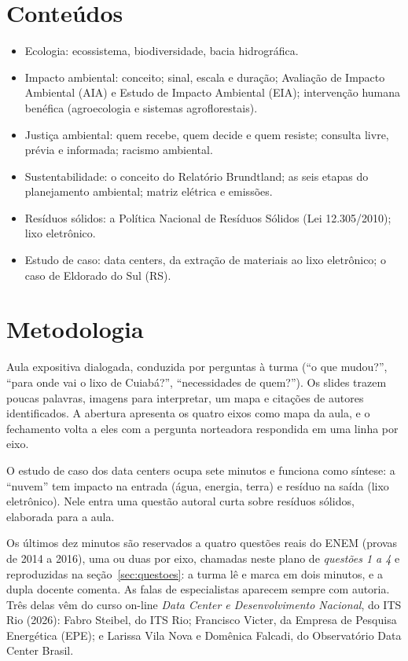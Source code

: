 \documentclass[11pt]{article}
\begin{document}
\section{Conteúdos}
\begin{itemize}
  \item Ecologia: ecossistema, biodiversidade, bacia hidrográfica.
  \item Impacto ambiental: conceito; sinal, escala e duração; Avaliação de Impacto Ambiental (AIA) e Estudo de
        Impacto Ambiental (EIA); intervenção humana benéfica (agroecologia e sistemas agroflorestais).
  \item Justiça ambiental: quem recebe, quem decide e quem resiste; consulta livre, prévia e informada; racismo ambiental.
  \item Sustentabilidade: o conceito do Relatório Brundtland; as seis etapas do planejamento ambiental;
        matriz elétrica e emissões.
  \item Resíduos sólidos: a Política Nacional de Resíduos Sólidos (Lei 12.305/2010); lixo eletrônico.
  \item Estudo de caso: data centers, da extração de materiais ao lixo eletrônico; o caso de Eldorado do Sul (RS).
\end{itemize}

\section{Metodologia}
Aula expositiva dialogada, conduzida por perguntas à turma (\enquote{o que mudou?}, \enquote{para onde vai o lixo
de Cuiabá?}, \enquote{necessidades de quem?}). Os slides trazem poucas palavras, imagens para interpretar, um mapa
e citações de autores identificados. A abertura apresenta os quatro eixos como mapa da aula, e o fechamento volta
a eles com a pergunta norteadora respondida em uma linha por eixo.

O estudo de caso dos data centers ocupa sete minutos e funciona como síntese: a \enquote{nuvem} tem impacto na
entrada (água, energia, terra) e resíduo na saída (lixo eletrônico). Nele entra uma questão autoral curta sobre
resíduos sólidos, elaborada para a aula.

Os últimos dez minutos são reservados a quatro questões reais do ENEM (provas de 2014 a 2016), uma ou duas por
eixo, chamadas neste plano de \emph{questões 1 a 4} e reproduzidas na seção~\ref{sec:questoes}: a turma lê e marca
em dois minutos, e a dupla docente comenta. As falas de especialistas aparecem sempre com autoria. Três delas vêm
do curso on-line \emph{Data Center e Desenvolvimento Nacional}, do ITS Rio (2026): Fabro Steibel, do ITS Rio;
Francisco Victer, da Empresa de Pesquisa Energética (EPE); e Larissa Vila Nova e Domênica Falcadi, do
Observatório Data Center Brasil.
\end{document}
